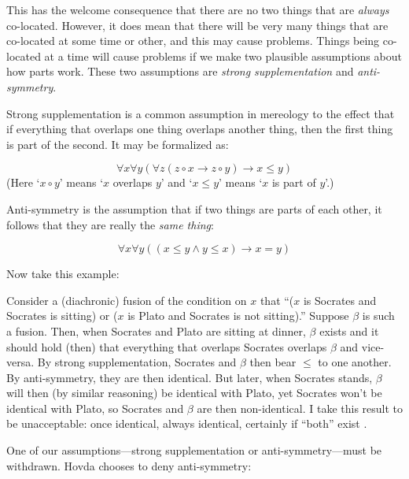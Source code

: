 \documentclass[11pt]{article}
\newenvironment{squote}{%
\begin{spacing}{1}
\begin{list}{}{%
\setlength{\labelwidth}{0pt}%
\rightmargin\leftmargin%
}
\item\relax
}{%
\end{list}%
\end{spacing}
}
\begin{document}
\begin{spacing}{1.5}
This has the welcome consequence that there are no two things that are
{\em always} co-located.  However, it does mean that there will be
very many things that are co-located at some time or other, and this
may cause problems.  Things being co-located at a time will cause
problems if we make two plausible assumptions about how parts work.
These two assumptions are {\em strong supplementation} and {\em
  anti-symmetry}.

Strong supplementation is a common assumption in mereology to the
effect that if everything that overlaps one thing overlaps another
thing, then the first thing is part of the second.  It may be
formalized as:

\begin{displaymath}
\forall x \forall y ( \forall z ( z \circ x \rightarrow z \circ y )
\rightarrow x \leq y )
\end{displaymath}
(Here `$x \circ y$' means `$x$ overlaps $y$' and `$x \leq y$' means
`$x$ is part of $y$'.)

Anti-symmetry is the assumption that if two things are parts of each
other, it follows that they are really the {\em same thing}:

\begin{displaymath}
\forall x \forall y ( ( x \leq y \wedge y \leq x ) \rightarrow x = y )
\end{displaymath}

Now take this example:

\begin{squote}
Consider a (diachronic) fusion of the condition on $x$ that ``($x$ is
Socrates and Socrates is sitting) or ($x$ is Plato and Socrates is not
sitting).''  Suppose $\beta$ is such a fusion.  Then, when Socrates
and Plato are sitting at dinner, $\beta$ exists and it should hold
(then) that everything that overlaps Socrates overlaps $\beta$ and
vice-versa.  By strong supplementation, Socrates and $\beta$ then bear
$\leq$ to one another.  By anti-symmetry, they are then identical.
But later, when Socrates stands, $\beta$ will then (by similar
reasoning) be identical with Plato, yet Socrates won’t be identical
with Plato, so Socrates and $\beta$ are then non-identical.  I take
this result to be unacceptable: once identical, always identical,
certainly if ``both'' exist \citeyearpar[17]{hovda2011}.
\end{squote}

One of our assumptions---strong supplementation or
anti-symmetry---must be withdrawn.  Hovda chooses to deny
anti-symmetry:


\end{spacing}
\end{document}
